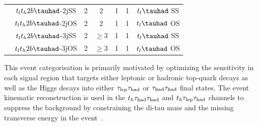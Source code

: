 \documentclass[PAPER, coverpage, atlasdraft=true, texlive=2016, UKenglish]{\ATLASLATEXPATH atlasdoc}
\providecommand{\DIFadd}[1]{{\protect\color{blue}\uwave{#1}}} %
\providecommand{\DIFdel}[1]{{\protect\color{red}\sout{#1}}}                      %
\providecommand{\DIFaddbegin}{} %
\providecommand{\DIFaddend}{} %
\providecommand{\DIFaddFL}[1]{\DIFadd{#1}} %
\providecommand{\DIFdelFL}[1]{\DIFdel{#1}} %
\providecommand{\DIFaddbeginFL}{} %
\providecommand{\DIFaddendFL}{} %
\providecommand{\DIFdelbeginFL}{} %
\providecommand{\DIFdelendFL}{} %
\begin{document}
\begin{table}
\begin{tabular}[h]{c|c|c|c|c|c|c}
&\DIFdelbeginFL \DIFdelFL{$t_lt_h2b\tauhad$}\DIFdelendFL \DIFaddbeginFL \DIFaddFL{$t_{\ell}t_h2b\tauhad$}\DIFaddendFL -2jSS & 2     & 2                             & 1      & 1             & \DIFdelbeginFL \DIFdelFL{$t_l\tauhad$ }\DIFdelendFL \DIFaddbeginFL \DIFaddFL{$t_{\ell}\tauhad$ }\DIFaddendFL SS\\ \cline{2-7}
&\DIFdelbeginFL \DIFdelFL{$t_lt_h2b\tauhad$}\DIFdelendFL \DIFaddbeginFL \DIFaddFL{$t_{\ell}t_h2b\tauhad$}\DIFaddendFL -2jOS & 2     & 2                             & 1      & 1             & \DIFdelbeginFL \DIFdelFL{$t_l\tauhad$ }\DIFdelendFL \DIFaddbeginFL \DIFaddFL{$t_{\ell}\tauhad$ }\DIFaddendFL OS\\ \cline{2-7}
&\DIFdelbeginFL \DIFdelFL{$t_lt_h2b\tauhad$}\DIFdelendFL \DIFaddbeginFL \DIFaddFL{$t_{\ell}t_h2b\tauhad$}\DIFaddendFL -3jSS & 2     & $\ge3$                        & 1      & 1             & \DIFdelbeginFL \DIFdelFL{$t_l\tauhad$ }\DIFdelendFL \DIFaddbeginFL \DIFaddFL{$t_{\ell}\tauhad$ }\DIFaddendFL SS\\ \cline{2-7}
&\DIFdelbeginFL \DIFdelFL{$t_lt_h2b\tauhad$}\DIFdelendFL \DIFaddbeginFL \DIFaddFL{$t_{\ell}t_h2b\tauhad$}\DIFaddendFL -3jOS & 2     & $\ge3$                & 1      & 1             & \DIFdelbeginFL \DIFdelFL{$t_l\tauhad$ }\DIFdelendFL \DIFaddbeginFL \DIFaddFL{$t_{\ell}\tauhad$ }\DIFaddendFL OS\\ \hline
\end{tabular}
\end{table}







This event categorisation is primarily motivated by optimizing the sensitivity in each signal region that targets either leptonic or hadronic top-quark
decays as well as the Higgs decays into either $\tau_{\mathrm{lep}} \tau_{\mathrm{had}}$ or $\tau_{\mathrm{had}} \tau_{\mathrm{had}}$ final states.   
The event kinematic reconstruction is used in the $t_h\tau_{\mathrm{had}} \tau_{\mathrm{had}}$ and $t_h\tau_{\mathrm{lep}} \tau_{\mathrm{had}}$ channels to suppress the background by constraining the
di-tau mass and the missing transverse energy in the event~\cite{Chen:2015nta}.
\DIFaddbegin 

\DIFaddend %
\end{document}
